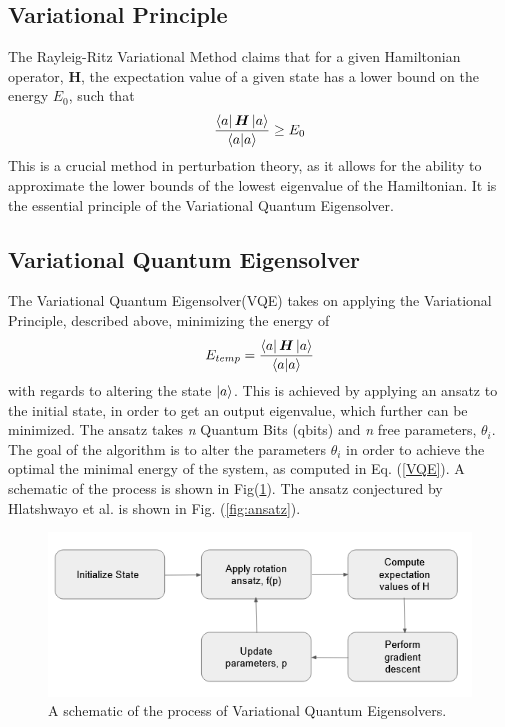 \subsection{Variational Principle}
The Rayleig-Ritz Variational Method claims that for a given Hamiltonian operator, \textbf{H}, the expectation value of a given state has a lower bound on the energy $E_0$, such that
\begin{equation}
    \frac{\bra{a}\boldsymbol{H}\ket{a}}{\braket{a}} \geq E_0
\end{equation}
This is a crucial method in perturbation theory, as it allows for the ability to approximate the lower bounds of the lowest eigenvalue of the Hamiltonian. It is the essential principle of the Variational Quantum Eigensolver. 

\subsection{Variational Quantum Eigensolver}
The Variational Quantum Eigensolver(VQE) takes on applying the Variational Principle, described above, minimizing the energy of 
\begin{equation}\label{VQE}
    E_{temp} = \frac{\bra{a}\boldsymbol{H}\ket{a}}{\braket{a}}
\end{equation}
with regards to altering the state $\ket{a}$. This is achieved by applying an ansatz to the initial state, in order to get an output eigenvalue, which further can be minimized. The ansatz takes \textit{n} Quantum Bits (qbits) and \textit{n} free parameters, $\theta_i$. The goal of the algorithm is to alter the parameters $\theta_i$ in order to achieve the optimal the minimal energy of the system, as computed in Eq. (\ref{VQE}). A schematic of the process is shown in Fig(\ref{fig:VQE_scheme}). The ansatz conjectured by Hlatshwayo et al. \cite{} is shown in Fig. (\ref{fig:ansatz}). \begin{figure}
    \centering
    \includegraphics[scale=0.8]{figs/VQE.PNG}
    \caption{A schematic of the process of Variational Quantum Eigensolvers.}
    \label{fig:VQE_scheme}
\end{figure}
